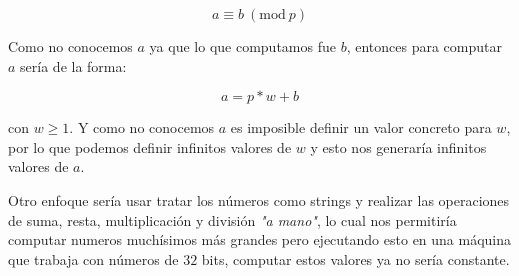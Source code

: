 \documentclass{article}
\begin{document}
$$ a \equiv b\ (\textrm{mod}\ p) $$

Como no conocemos $a$ ya que lo que computamos fue $b$, entonces para computar $a$ sería de la forma:

$$ a = p * w + b $$

con $w \geq 1$. Y como no conocemos $a$ es imposible definir un valor concreto para $w$, por lo que podemos definir infinitos valores de $w$ y esto nos generaría infinitos valores de $a$.

Otro enfoque sería usar tratar los números como strings y realizar las operaciones de suma, resta, multiplicación y división \textit{"a mano"}, lo cual nos permitiría computar numeros muchísimos más grandes pero ejecutando esto en una máquina que trabaja con números de $32$ bits, computar estos valores ya no sería constante. 
\end{document}
